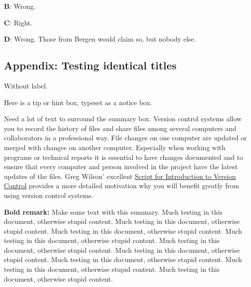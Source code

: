 \n\documentclass[%
oneside,                 %
final,                   %
10pt]{article}
\newenvironment{doconcequiz}{}{}
\newenvironment{notice_mdfboxadmon}[1][]{
\begin{notice_mdfboxmdframed}[frametitle=#1]
}
{
\end{notice_mdfboxmdframed}
}
\newenvironment{summary_mdfboxadmon}[1][]{
\begin{summary_mdfboxmdframed}[frametitle=#1]
}
{
\end{summary_mdfboxmdframed}
}
\theoremstyle{definition}
\begin{document}
\begin{enumerate}
\begin{doconcequiz}
\textbf{B}: Wrong. 

\textbf{C}: Right. 

\textbf{D}: Wrong. Those from Bergen would claim so, but nobody else.




\vspace{3mm}

\end{doconcequiz}



\subsection{Appendix: Testing identical titles}

Without label.


\begin{notice_mdfboxadmon}[Tip.]
Here is a tip or hint box, typeset as a notice box.
\end{notice_mdfboxadmon} %



\clearpage

Need a lot of text to surround the summary box.
Version control systems allow you to record the history of files
and share files among several computers and collaborators in a
professional way. File changes on one computer are updated or
merged with changes on another computer. Especially when working
with programs or technical reports it is essential
to have changes documented and to
ensure that every computer and person involved in the project
have the latest updates of the files.
Greg Wilson' excellent \href{{https://software-carpentry.org/2010/07/script-for-introduction-to-version-control/}}{Script for Introduction to Version Control} provides a more detailed motivation why you will benefit greatly
from using version control systems.


\begin{summary_mdfboxadmon}[Summary.]
\textbf{Bold remark:} Make some text with this summary.
Much testing in this document, otherwise stupid content.
Much testing in this document, otherwise stupid content.
Much testing in this document, otherwise stupid content.
Much testing in this document, otherwise stupid content.
Much testing in this document, otherwise stupid content.
Much testing in this document, otherwise stupid content.
Much testing in this document, otherwise stupid content.
Much testing in this document, otherwise stupid content.
Much testing in this document, otherwise stupid content.
\end{summary_mdfboxadmon} %




\end{enumerate}
\end{document}
